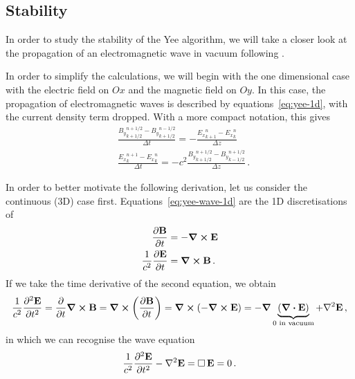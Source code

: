 \documentclass[12pt, class=report, crop=false]{standalone}
\begin{document}

\subsection{Stability}

In order to study the stability of the Yee algorithm, we will take a closer look
at the propagation of an electromagnetic wave in vacuum
following \textcite{lehe_electromagneticwave_2018}.

In order to simplify the calculations, we will begin with the one dimensional
case with the electric field on \(Ox\) and the magnetic field on \(Oy\).
In this case, the propagation of electromagnetic waves is described by
equations~\eqref{eq:yee-1d}, with the current density term dropped.
With a more compact notation, this gives
\begin{subequations}%
\label{eq:yee-wave-1d}
  \begin{align}
    &\frac{{B_y}^{n+1/2}_{k+1/2} - {B_y}^{n-1/2}_{k+1/2}}{\Delta t} =
    - \frac{{E_x}^n_{k+1} - {E_x}^n_k}{\Delta z} \label{eq:yee-wave-1d-faraday}\\
    &\frac{{E_x}^{n+1}_k - {E_x}^n_k}{\Delta t} =
    -c^2 \frac{{B_y}^{n+1/2}_{k+1/2} - {B_y}^{n+1/2}_{k-1/2}}{\Delta z}
    \label{eq:yee-wave-1d-ampere}\,.
  \end{align}
\end{subequations}

In order to better motivate the following derivation, let us consider the continuous
(3D) case first. Equations~\eqref{eq:yee-wave-1d} are the 1D discretisations
of
\[
\begin{aligned}
  \pdv{\vb{B}}{t} &= -\curl{\vb{E}} \\
  \frac{1}{c^2}\pdv{\vb{E}}{t} &= \curl{\vb{B}} \,.
\end{aligned}
\]
If we take the time derivative of the second equation, we obtain
\[
\frac{1}{c^2}\pdv[2]{\vb{E}}{t} = \pdv{t} \curl{\vb{B}} = \curl{\left(\pdv{\vb{B}}{t}\right)}
= \curl{\left(-\curl{\vb{E}}\right)} = - \grad{\underbrace{(\div{\vb{E}})}_{0\text{ in vacuum}}} + \laplacian{\vb{E}}\,,
\]
in which we can recognise the wave equation
\[
\frac{1}{c^2}\pdv[2]{\vb{E}}{t} - \laplacian{\vb{E}} = \dalambert{\vb{E}} = 0\,.
\]
\end{document}
